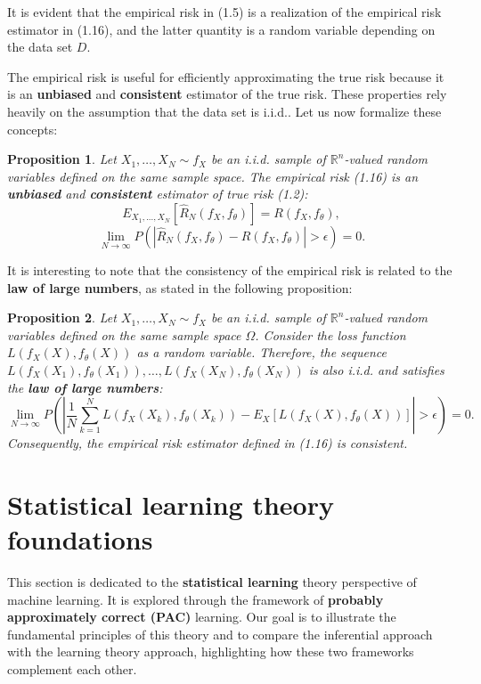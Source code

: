 \documentclass{report}
\newtheorem{proposition}{Proposition}[chapter]
\begin{document}
It is evident that the empirical risk in (1.5) is a realization of the empirical risk estimator in (1.16), and the latter quantity is a random variable depending on the data set $D$.

The empirical risk is useful for efficiently approximating the true risk because it is an \textbf{unbiased} and \textbf{consistent} estimator of the true risk. These properties rely heavily on the assumption that the data set is i.i.d.. Let us now formalize these concepts:

\begin{proposition}
Let $X_1,\dots,X_N \sim f_X$ be an i.i.d. sample of $\mathbb{R}^n$-valued random variables defined on the same sample space. The empirical risk (1.16) is an \textbf{unbiased} and \textbf{consistent} estimator of true risk (1.2):
\begin{equation}
 E_{X_1,...,X_N}[\hat{R}_N(f_X,f_\theta)] = R(f_X,f_\theta),
\end{equation}
\begin{equation}
\lim_{N\to \infty}P(|\hat{R}_N(f_X,f_\theta)-R(f_X,f_\theta)| > \epsilon) = 0.
\end{equation}
\end{proposition}

It is interesting to note that the consistency of the empirical risk is related to the \textbf{law of large numbers}, as stated in the following proposition:
\begin{proposition}
Let $X_1,\dots,X_N \sim f_X$ be an i.i.d. sample of $\mathbb{R}^n$-valued random variables defined on the same sample space $\Omega$. Consider the loss function $L(f_X(X), f_\theta(X))$ as a random variable. Therefore, the sequence $L(f_X(X_1),f_\theta(X_1)),\dots,L(f_X(X_N),f_\theta(X_N))$ is also i.i.d. and satisfies the \textbf{law of large numbers}:
\begin{equation}
\lim_{N\to \infty}P\left(\left|\frac{1}{N}\sum_{k=1}^NL(f_X(X_k),f_\theta(X_k)) - E_{X}[L(f_X(X),f_\theta(X))]\right| > \epsilon\right) = 0.
\end{equation}
Consequently, the empirical risk estimator defined in (1.16) is consistent.
\end{proposition}

\section{Statistical learning theory foundations}
This section is dedicated to the \textbf{statistical learning} theory perspective of machine learning. It is explored through the framework of \textbf{probably approximately correct (PAC)} learning. Our goal is to illustrate the fundamental principles of this theory and to compare the inferential approach with the learning theory approach, highlighting how these two frameworks complement each other.
\end{document}
